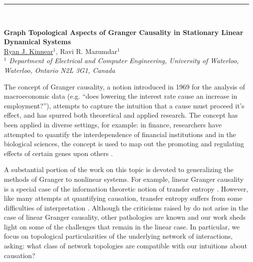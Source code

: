 \documentclass[12pt]{article}
\begin{document}
\hspace{-0.70cm}\rule{17.5cm}{0.01 in} \\
\vspace{-0.4cm}
\begin{flushleft}
  \Large \textbf{\noindent Graph Topological Aspects of Granger
    Causality in Stationary Linear Dynamical Systems}
\\
\vspace{0.5cm}
\normalsize
\normalsize{
 \underline{Ryan J. Kinnear}$^1$, Ravi R. Mazumdar$^1$
} \\
\vspace{5mm}
\textit{\footnotesize
$^1$ Department of Electrical and Computer Engineering, University of Waterloo, Waterloo, Ontario N2L 3G1, Canada\\
}
\end{flushleft}

The concept of Granger causality, a notion introduced in 1969
\cite{granger1969investigating} for the analysis of macroeconomic data
(e.g. ``does lowering the interest rate cause an increase in
employment?''), attempts to capture the intuition that a cause must
proceed it's effect, and has spurred both theoretical and applied
research.  The concept has been applied in diverse settings, for
example: in finance, researchers have attempted to quantify the
interdependence of financial institutions \cite{NBERw16223} and in the
biological sciences, the concept is used to map out the promoting and
regulating effects of certain genes upon others
\cite{methods_for_inferring_gene_regulatory_networks_from_time_series_expression_data}.

A substantial portion of the work on this topic is devoted to
generalizing the methods of Granger to nonlinear systems.  For
example, linear Granger causality is a special case of the information
theoretic notion of transfer entropy \cite{barnett2009granger}.
However, like many attempts at quantifying causation, transfer entropy
suffers from some difficulties of interpretation
\cite{transfer_entropy_criticism}.  Although the criticisms raised by
\cite{transfer_entropy_criticism} do not arise in the case of linear
Granger causality, other pathologies are known and our work sheds
light on some of the challenges that remain in the linear case.  In
particular, we focus on topological particularities of the underlying
network of interactions, asking: what class of network topologies are
compatible with our intuitions about causation?
\end{document}
